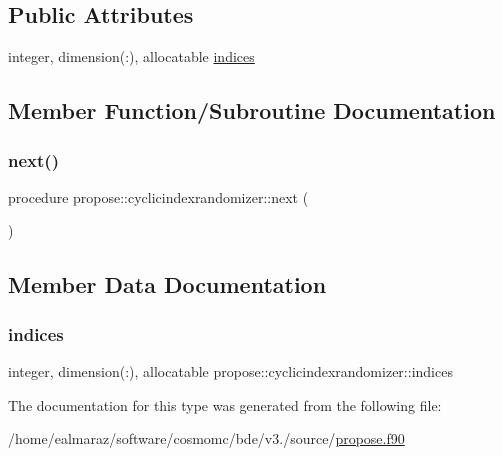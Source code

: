 \subsection*{Public Attributes}
\begin{DoxyCompactItemize}
\item 
integer, dimension(\+:), allocatable \mbox{\hyperlink{structpropose_1_1cyclicindexrandomizer_a0a0b80f6547c988651473195c362ed6e}{indices}}
\end{DoxyCompactItemize}


\subsection{Member Function/\+Subroutine Documentation}
\mbox{\label{structpropose_1_1cyclicindexrandomizer_a95fad74d52a00c5f3ef2497b61b3c75b}} 
\subsubsection{\texorpdfstring{next()}{next()}}
{\footnotesize\ttfamily procedure propose\+::cyclicindexrandomizer\+::next (\begin{DoxyParamCaption}{ }\end{DoxyParamCaption})}



\subsection{Member Data Documentation}
\mbox{\label{structpropose_1_1cyclicindexrandomizer_a0a0b80f6547c988651473195c362ed6e}} 
\subsubsection{\texorpdfstring{indices}{indices}}
{\footnotesize\ttfamily integer, dimension(\+:), allocatable propose\+::cyclicindexrandomizer\+::indices}



The documentation for this type was generated from the following file\+:\begin{DoxyCompactItemize}
\item 
/home/ealmaraz/software/cosmomc/bde/v3./source/\mbox{\hyperlink{propose_8f90}{propose.\+f90}}\end{DoxyCompactItemize}
